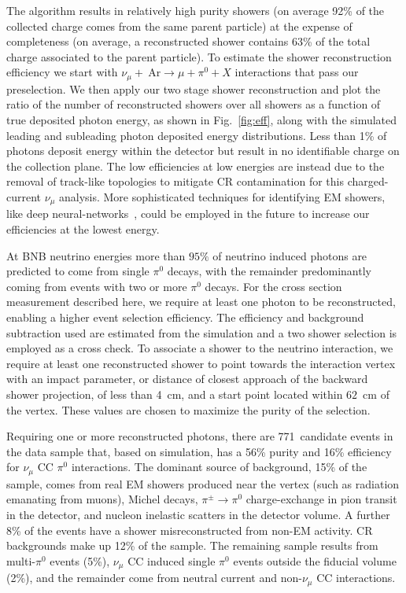 \documentclass[%
 reprint,
superscriptaddress,
amsmath,amssymb,
prl,
floatfix,
]{revtex4-1}
\newcommand{\numu}{\nu_{\mu}}
\newcommand{\pio}{\pi^{0}}
\begin{document}
The algorithm results in relatively high purity showers (on average 92\% of the collected charge comes from the same parent particle) at the expense of completeness (on average, a reconstructed shower contains 63\% of the total charge associated to the parent particle). To estimate the shower reconstruction efficiency we start with $\numu+~\text{Ar}\rightarrow\mu+\pio+X$ interactions that pass our preselection. We then apply our two stage shower reconstruction and plot the ratio of the number of reconstructed showers over all showers as a function of true deposited photon energy, as shown in Fig.~\ref{fig:eff}, along with the simulated leading and subleading photon deposited energy distributions. Less than 1\% of photons deposit energy within the detector but result in no identifiable charge on the collection plane. The low efficiencies at low energies are instead due to the removal of track-like topologies to mitigate CR contamination for this charged-current $\numu$ analysis. More sophisticated techniques for identifying EM showers, like deep neural-networks~\cite{ssnet}, could be employed in the future to increase our efficiencies at the lowest energy. 

At BNB neutrino energies more than $95\%$ of neutrino induced photons are 
predicted to come from single $\pio$ decays, with the remainder predominantly coming from events with two or more $\pio$ decays. For the cross section measurement described here, we require at least one photon to be reconstructed, enabling a higher event selection efficiency. The efficiency and background subtraction used are estimated from the simulation and a two shower selection is employed as a cross check. To associate a shower to the neutrino interaction, we require at least one reconstructed shower to point towards the interaction vertex with an impact parameter, or distance of closest approach of the backward shower projection, of less than 4~cm, and a start point located within $62$~cm of the vertex. These values are chosen to maximize the purity of the selection.

Requiring one or more reconstructed photons, there are 771~candidate events in the data sample that, based on simulation, has a 56\% purity and 16\% efficiency for $\numu$ CC $\pio$ interactions. The dominant source of background, 15\% of the sample, comes from real EM showers produced near the vertex (such as radiation emanating from muons), Michel decays, $\pi^{\pm}\rightarrow\pio$ charge-exchange in pion transit in the detector, and nucleon inelastic scatters in the detector volume. A further 8\% of the events have a shower misreconstructed from non-EM activity. CR backgrounds make up 12\% of the sample. The remaining sample results from multi-$\pio$ events (5\%), $\numu$ CC induced single $\pio$ events outside the fiducial volume (2\%), and the remainder come from neutral current and non-$\numu$ CC interactions.
\end{document}
